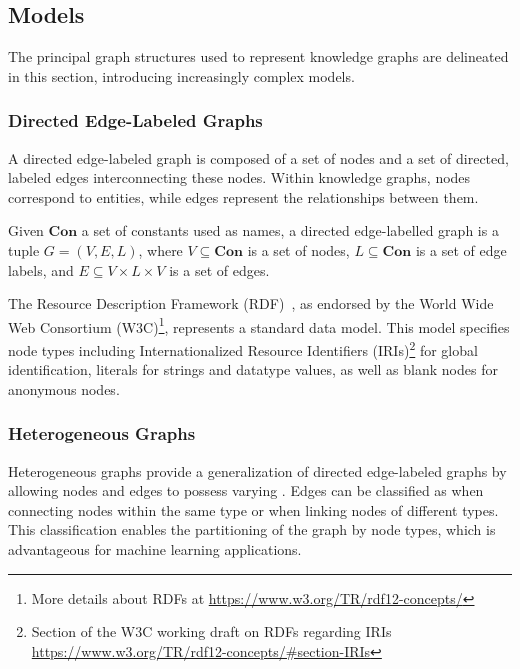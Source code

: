 \subsection{Models}\label{models}
The principal graph structures used to represent knowledge graphs are delineated in this section, introducing increasingly complex models.

\subsubsection{Directed Edge-Labeled Graphs}\label{models:directed_edge_labeled_graphs}
A directed edge-labeled graph is composed of a set of nodes and a set of directed, labeled edges interconnecting these nodes. Within knowledge graphs, nodes correspond to entities, while edges represent the relationships between them. 

\begin{definition}\label{def:directed-edge-labelled-graph}
    Given $\textbf{Con}$ a set of constants used as names, a directed edge-labelled graph is a tuple $G = (V, E, L)$, where $V \subseteq \textbf{Con}$ is a set of nodes, $L \subseteq \textbf{Con}$ is a set of edge labels, and $E \subseteq V \times L \times V$ is a set of edges.
\end{definition}

The Resource Description Framework (RDF)~\cite{Cyganiak2014rdf}, as endorsed by the World Wide Web Consortium (W3C)\footnote{More details about RDFs at \url{https://www.w3.org/TR/rdf12-concepts/}}, represents a standard data model. This model specifies node types including Internationalized Resource Identifiers (IRIs)\footnote{Section of the W3C working draft on RDFs regarding IRIs \url{https://www.w3.org/TR/rdf12-concepts/\#section-IRIs}} for global identification, literals for strings and datatype values, as well as blank nodes for anonymous nodes.

\subsubsection{Heterogeneous Graphs}
Heterogeneous graphs provide a generalization of directed edge-labeled graphs by allowing nodes and edges to possess varying . Edges can be classified as  when connecting nodes within the same type or  when linking nodes of different types. This classification enables the partitioning of the graph by node types, which is advantageous for machine learning applications.

